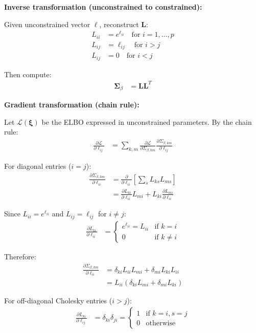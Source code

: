 \documentclass[11pt]{article}
\begin{document}
\textbf{Inverse transformation (unconstrained to constrained):}

Given unconstrained vector $\bm{\ell}$, reconstruct $\bm{L}$:
\begin{align}
L_{ii} &= e^{\ell_{ii}} \quad \text{for } i=1,\ldots,p\\
L_{ij} &= \ell_{ij} \quad \text{for } i > j\\
L_{ij} &= 0 \quad \text{for } i < j
\end{align}

Then compute:
\begin{align}
\bm{\Sigma}_\beta &= \bm{L}\bm{L}^T
\end{align}

\textbf{Gradient transformation (chain rule):}

Let $\mathcal{L}(\bm{\xi})$ be the ELBO expressed in unconstrained parameters. By the chain rule:
\begin{align}
\frac{\partial \mathcal{L}}{\partial \ell_{ij}} &= \sum_{k,m} \frac{\partial \mathcal{L}}{\partial \Sigma_{\beta,km}} \frac{\partial \Sigma_{\beta,km}}{\partial \ell_{ij}}
\end{align}

For diagonal entries ($i=j$):
\begin{align}
\frac{\partial \Sigma_{\beta,km}}{\partial \ell_{ii}} &= \frac{\partial}{\partial \ell_{ii}} \left[\sum_s L_{ks} L_{ms}\right]\\
&= \frac{\partial L_{ki}}{\partial \ell_{ii}} L_{mi} + L_{ki} \frac{\partial L_{mi}}{\partial \ell_{ii}}
\end{align}

Since $L_{ii} = e^{\ell_{ii}}$ and $L_{ij} = \ell_{ij}$ for $i \ne j$:
\begin{align}
\frac{\partial L_{ki}}{\partial \ell_{ii}} &= \begin{cases}
e^{\ell_{ii}} = L_{ii} & \text{if } k = i\\
0 & \text{if } k \ne i
\end{cases}
\end{align}

Therefore:
\begin{align}
\frac{\partial \Sigma_{\beta,km}}{\partial \ell_{ii}} &= \delta_{ki} L_{ii} L_{mi} + \delta_{mi} L_{ki} L_{ii}\\
&= L_{ii} (\delta_{ki} L_{mi} + \delta_{mi} L_{ki})
\end{align}

For off-diagonal Cholesky entries ($i > j$):
\begin{align}
\frac{\partial L_{ki}}{\partial \ell_{ij}} &= \delta_{ki} \delta_{ji} = \begin{cases}
1 & \text{if } k=i, s=j\\
0 & \text{otherwise}
\end{cases}
\end{align}
\end{document}
